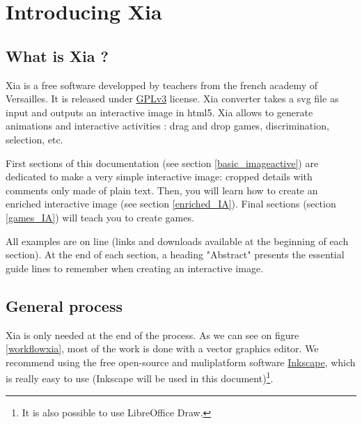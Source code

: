 




 \maketitle
 \tableofcontents
  
\section{Introducing Xia}

\subsection{What is Xia ?}

Xia is a free software developped by teachers from the french academy of Versailles.
It is released under \href{http://www.gnu.org/copyleft/gpl.html}{GPLv3} license.
Xia converter takes a svg file as input and outputs an interactive image in 
html5. Xia allows to generate animations and interactive activities : 
drag and drop games, discrimination, selection, etc.

First sections of this documentation (see section \ref{basic_imageactive}) are dedicated to make a very simple 
interactive image: cropped details with comments only made of plain text.
Then, you will learn how to create an enriched interactive image (see section \ref{enriched_IA}). Final sections (section \ref{games_IA}) will teach you to create games.

\begin{astuce}
All examples are on line (links and downloads available at 
the beginning of each section). At the end
of each section, a heading "Abstract" presents the essential guide lines to 
remember when creating an interactive image. 
\end{astuce}

\subsection{General process}

Xia is only needed at the end of the process.
As we can see on figure \ref{workflowxia}, most of the work is done with 
a  vector graphics editor. We recommend using the free open-source and 
muliplatform software \href{http://www.inkscape.org/}{Inkscape}, which is 
really easy to use (Inkscape will be used in this document)\footnote{It is also possible 
to use LibreOffice Draw.}.

